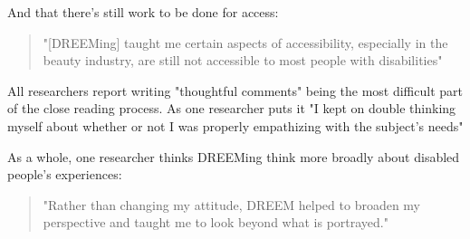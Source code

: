 And that there's still work to be done for access: 
\begin{quote}
    "[DREEMing] taught me certain aspects of accessibility, especially in the beauty industry, are still not accessible to most people with disabilities"
\end{quote}
  
All researchers report writing "thoughtful comments" being the most difficult part of the close reading process. As one researcher puts it "I kept on double thinking myself about whether or not I was properly empathizing with the subject's needs"

As a whole, one researcher thinks DREEMing think more broadly about disabled people's experiences:
\begin{quote}
        "Rather than changing my attitude, DREEM helped to broaden my perspective and taught me to look beyond what is portrayed."
\end{quote}
  










